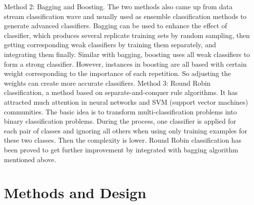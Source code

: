 \documentclass[12pt]{report}
\begin{document}
\newline
\newline
Method 2: Bagging and Boosting.
\newline The two methods also came up from data stream classification wave and usually used as ensemble classification methods to generate advanced classifiers. 
\newline Bagging can be used to enhance the effect of classifier, which produces several replicate training sets by random sampling, then getting corresponding weak classifiers by training them separately, and integrating them finally.
\newline Similar with bagging, boosting uses all weak classifiers to form a strong classifier. However, instances in boosting are all based with certain weight corresponding to the importance of each repetition. So adjusting the weights can create more accurate classifiers.
\newline
\newline
Method 3: Round Robin classification, a method based on separate-and-conquer rule algorithms.
\newline It has attracted much attention in neural networks and SVM (support vector machines) communities. The basic idea is to transform multi-classification problems into binary classification problems. During the process, one classifier is applied for each pair of classes and ignoring all others when using only training examples for these two classes. Then the complexity is lower. Round Robin classification has been proved to get further improvement by integrated with bagging algorithm mentioned above.

\section*{Methods and Design}
\end{document}
